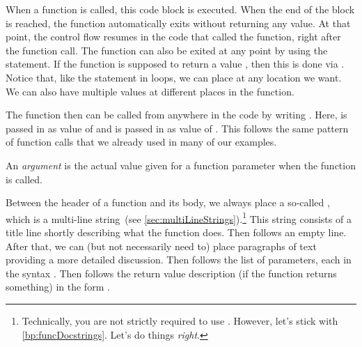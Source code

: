 When a function is called, this code block is executed.
When the end of the block is reached, the function automatically exits without returning any value.
At that point, the control flow resumes in the code that called the function, right after the function call.
The function can also be exited at any point by using the  statement.
If the function is supposed to return a value , then this is done via .
Notice that, like the  statement in loops, we can place  at any location we want.
We can also have multiple  values at different places in the function.%
%
\begin{sloppypar}%
The function  then can be called from anywhere in the code by writing .
Here,  is passed in as value of  and  is passed in as value of .
This follows the same pattern of function calls that we already used in many of our examples.%
\end{sloppypar}%
%
\begin{definition}[Argument]%
An \emph{argument} is the actual value given for a function parameter when the function is called.%
\end{definition}%
%
%
Between the header of a function and its body, we always place a so-called , which is a multi-line string~(see \cref{sec:multiLineStrings}).\footnote{%
Technically, you are not strictly required to use . %
However, let's stick with \cref{bp:funcDocstrings}. %
Let's do things \emph{right}.%
}
This string consists of a title line shortly describing what the function does.
Then follows an empty line.
After that, we can (but not necessarily need to) place paragraphs of text providing a more detailed discussion.
Then follows the list of parameters, each in the syntax .
Then follows the return value description (if the function returns something) in the form .%
%
%
